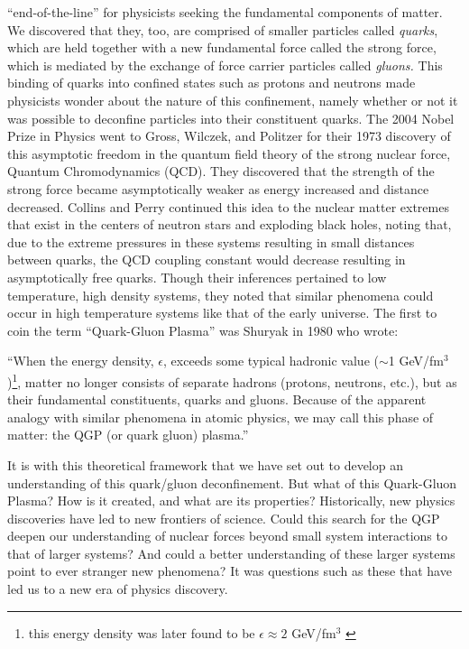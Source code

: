 ``end-of-the-line'' for physicists seeking the fundamental components of matter. We discovered that they, too, are comprised of smaller particles called \textit{quarks}, which are held together with a new fundamental force called the strong force, which is mediated by the exchange of force carrier particles called \textit{gluons.} This binding of quarks into confined states such as protons and neutrons made physicists wonder about the nature of this confinement, namely whether or not it was possible to deconfine particles into their constituent quarks. The 2004 Nobel Prize in Physics went to Gross, Wilczek\citep{PhysRevD.8.3633}, and Politzer\citep{PhysRevLett.30.1346} for their 1973 discovery of this asymptotic freedom in the quantum field theory of the strong nuclear force, Quantum Chromodynamics (QCD). They discovered that the strength of the strong force became asymptotically weaker as energy increased and distance decreased. Collins and Perry\citep{Collins:1974ky} continued this idea to the nuclear matter extremes that exist in the centers of neutron stars and exploding black holes, noting that, due to the extreme pressures in these systems resulting in small distances between quarks, the QCD coupling constant would decrease resulting in asymptotically free quarks. Though their inferences pertained to low temperature, high density systems, they noted that similar phenomena could occur in high temperature systems like that of the early universe. The first to coin the term ``Quark-Gluon Plasma'' was Shuryak in 1980 \citep{Shuryak:1980tp} who wrote: 

\begin{addmargin}[1.5em]{2em}``When the energy density, $\epsilon$, exceeds some typical hadronic value ($\sim$1 GeV/fm$^{3}$)\footnote{this energy density was later found to be $\epsilon \approx 2$ GeV/fm$^3$ \citep{Fries:2006pv}}, matter no longer consists of separate hadrons (protons, neutrons, etc.), but as their fundamental constituents, quarks and gluons. Because of the apparent analogy with similar phenomena in atomic physics, we may call this phase of matter: the QGP (or quark gluon) plasma.''
\end{addmargin}
 
It is with this theoretical framework that we have set out to develop an understanding of this quark/gluon deconfinement. But what of this Quark-Gluon Plasma? How is it created, and what are its properties? Historically, new physics discoveries have led to new frontiers of science. Could this search for the QGP deepen our understanding of nuclear forces beyond small system interactions to that of larger systems? And could a better understanding of these larger systems point to ever stranger new phenomena? It was questions such as these that have led us to a new era of physics discovery.

